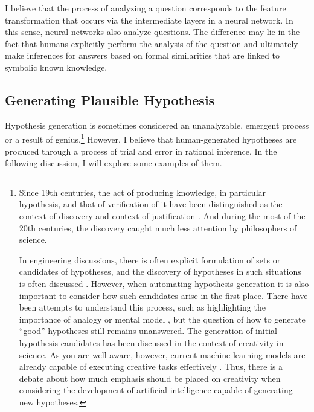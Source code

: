 \documentclass{article}
\begin{document}
I believe that the process of analyzing a question corresponds to the feature transformation that occurs via the intermediate layers in a neural network. In this sense, neural networks also analyze questions. The difference may lie in the fact that humans explicitly perform the analysis of the question and ultimately make inferences for answers based on formal similarities that are linked to symbolic known knowledge.

\subsection{Generating Plausible Hypothesis}

Hypothesis generation is sometimes considered an unanalyzable, emergent process or a result of genius.\footnote{
Since 19th centuries, the act of producing knowledge, in particular hypothesis, and that of verification of it have been distinguished as the context of discovery and context of justification \cite{sep-scientific-discovery}. And during the most of the 20th centuries, the discovery caught much less attention by philosophers of science.

In engineering discussions, there is often explicit formulation of sets or candidates of hypotheses, and the discovery of hypotheses in such situations is often discussed \cite{simon1973does,kitano2021nobel,bengio2022ml4sci}. However, when automating hypothesis generation it is also important to consider how such candidates arise in the first place. There have been attempts to understand this process, such as highlighting the importance of analogy \cite{thagard1984conceptual} or mental model \cite{nersessian1999model}, but the question of how to generate ``good'' hypotheses still remains unanswered. The generation of initial hypothesis candidates has been discussed in the context of creativity in science. As you are well aware, however, current machine learning models are already capable of executing creative tasks effectively \cite{sep-creativity}. Thus, there is a debate about how much emphasis should be placed on creativity when considering the development of artificial intelligence capable of generating new hypotheses.
} However, I believe that human-generated hypotheses are produced through a process of trial and error in rational inference. In the following discussion, I will explore some examples of them.
\end{document}
